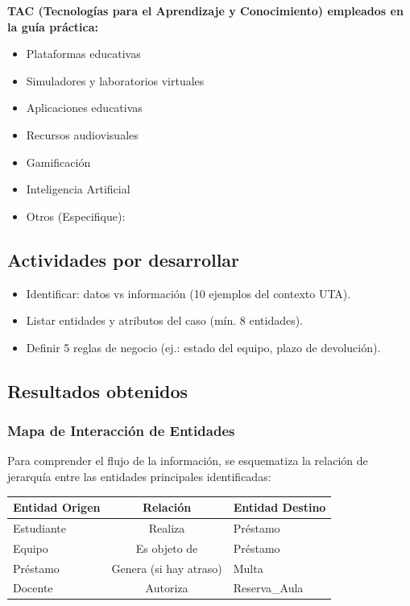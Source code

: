 \documentclass{article}
\begin{document}
\textbf{TAC (Tecnologías para el Aprendizaje y Conocimiento) empleados en la guía práctica:}
\begin{itemize}
    \item[$\checkmark$] Plataformas educativas
    \item[$\square$] Simuladores y laboratorios virtuales
    \item[$\checkmark$] Aplicaciones educativas
    \item[$\square$] Recursos audiovisuales
    \item[$\square$] Gamificación
    \item[$\checkmark$] Inteligencia Artificial
    \item Otros (Especifique): \underline{\hspace{5cm}}
\end{itemize}
\subsection{Actividades por desarrollar}
\begin{itemize}
    \item Identificar: datos vs información (10 ejemplos del contexto UTA).
    \item Listar entidades y atributos del caso (mín. 8 entidades).
    \item Definir 5 reglas de negocio (ej.: estado del equipo, plazo de devolución).
\end{itemize}
\subsection{Resultados obtenidos}
\subsubsection{Mapa de Interacción de Entidades}
Para comprender el flujo de la información, se esquematiza la relación de jerarquía entre las entidades principales identificadas:

\begin{center}
\begin{tabular}{|l|c|l|}
\hline
\rowcolor[HTML]{EFEFEF} 
\textbf{Entidad Origen} & \textbf{Relación} & \textbf{Entidad Destino} \\ \hline
Estudiante & Realiza & Préstamo \\ \hline
Equipo & Es objeto de & Préstamo \\ \hline
Préstamo & Genera (si hay atraso) & Multa \\ \hline
Docente & Autoriza & Reserva\_Aula \\ \hline
\end{tabular}
\end{center}
\end{document}
